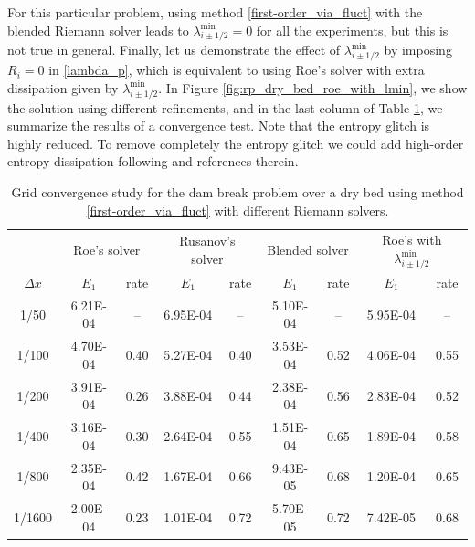 \documentclass[preprint, 11pt]{article}
\begin{document}
For this particular problem, using method \eqref{first-order_via_fluct} with the blended Riemann solver
leads to $\lambda_{i\pm 1/2}^{\min}=0$ for all the experiments, but this is not true in general.
Finally, let us demonstrate the effect of $\lambda_{i\pm 1/2}^{\min}$ by imposing $R_{i}=0$ in \eqref{lambda_p},
which is equivalent to using Roe's solver with extra dissipation given by $\lambda_{i\pm 1/2}^{\min}$.
In Figure \ref{fig:rp_dry_bed_roe_with_lmin}, we show the solution using different refinements,
and in the last column of Table \ref{table:rp_dry_bed}, we summarize the results of a convergence test.
Note that the entropy glitch is highly reduced. 
To remove completely the entropy glitch we could add high-order entropy dissipation following \cite{tadmor2003entropy}
and references therein.

\begin{table}[!ht]\scriptsize
  \begin{center}
    \begin{tabular}{||c||c|c||c|c||c|c||c|c||} \hline
      & \multicolumn{2}{c||}{Roe's solver}  
      &\multicolumn{2}{c||}{Rusanov's solver} 
      &\multicolumn{2}{c||}{Blended solver}
      &\multicolumn{2}{c||}{Roe's with $\lambda_{i\pm 1/2}^{\min}$} \\ \cline{2-9}
      $\Delta x$ & $E_1$ & rate & $E_1$ & rate & $E_1$ & rate & $E_1$ & rate \\ \hline
      1/50   & 6.21E-04 &  --  & 6.95E-04 &   -- & 5.10E-04 &  --  & 5.95E-04 & --   \\
      1/100  & 4.70E-04 & 0.40 & 5.27E-04 & 0.40 & 3.53E-04 & 0.52 & 4.06E-04 & 0.55 \\
      1/200  & 3.91E-04 & 0.26 & 3.88E-04 & 0.44 & 2.38E-04 & 0.56 & 2.83E-04 & 0.52 \\
      1/400  & 3.16E-04 & 0.30 & 2.64E-04 & 0.55 & 1.51E-04 & 0.65 & 1.89E-04 & 0.58 \\
      1/800  & 2.35E-04 & 0.42 & 1.67E-04 & 0.66 & 9.43E-05 & 0.68 & 1.20E-04 & 0.65 \\
      1/1600 & 2.00E-04 & 0.23 & 1.01E-04 & 0.72 & 5.70E-05 & 0.72 & 7.42E-05 & 0.68 \\ \hline
    \end{tabular}
    \caption{Grid convergence study for the dam break problem over a dry bed
      using method \eqref{first-order_via_fluct} with different Riemann solvers.\label{table:rp_dry_bed}}
  \end{center}
\end{table}
\end{document}
